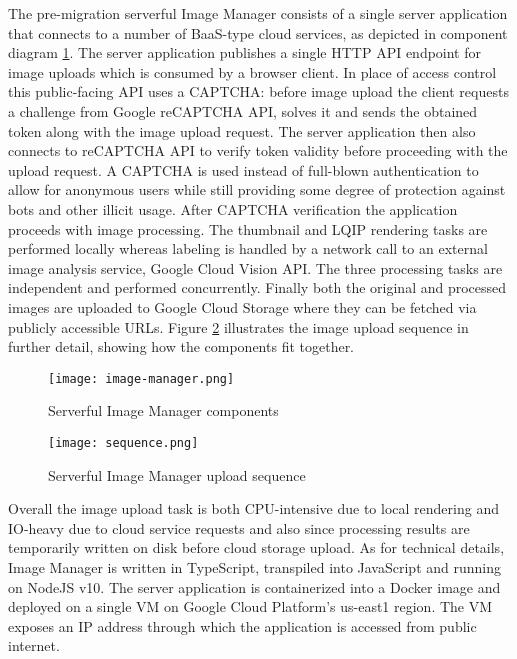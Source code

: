 The pre-migration serverful Image Manager consists of a single server application that connects to a number of BaaS-type cloud services, as depicted in component diagram \ref{fig:serverfulArchitecture}. The server application publishes a single HTTP API endpoint for image uploads which is consumed by a browser client. In place of access control this public-facing API uses a CAPTCHA: before image upload the client requests a challenge from Google reCAPTCHA API, solves it and sends the obtained token along with the image upload request. The server application then also connects to reCAPTCHA API to verify token validity before proceeding with the upload request. A CAPTCHA is used instead of full-blown authentication to allow for anonymous users while still providing some degree of protection against bots and other illicit usage. After CAPTCHA verification the application proceeds with image processing. The thumbnail and LQIP rendering tasks are performed locally whereas labeling is handled by a network call to an external image analysis service, Google Cloud Vision API. The three processing tasks are independent and performed concurrently. Finally both the original and processed images are uploaded to Google Cloud Storage where they can be fetched via publicly accessible URLs. Figure \ref{fig:serverfulSequence} illustrates the image upload sequence in further detail, showing how the components fit together.

\begin{figure}[h]
  \centering
  \texttt{[image: image-manager.png]}
  \caption{Serverful Image Manager components}
  \label{fig:serverfulArchitecture}
\end{figure}

\begin{figure}[h]
  \centering
  \texttt{[image: sequence.png]}
  \caption{Serverful Image Manager upload sequence}
  \label{fig:serverfulSequence}
\end{figure}

Overall the image upload task is both CPU-intensive due to local rendering and IO-heavy due to cloud service requests and also since processing results are temporarily written on disk before cloud storage upload. As for technical details, Image Manager is written in TypeScript, transpiled into JavaScript and running on NodeJS v10. The server application is containerized into a Docker image and deployed on a single VM on Google Cloud Platform's us-east1 region. The VM exposes an IP address through which the application is accessed from public internet.

